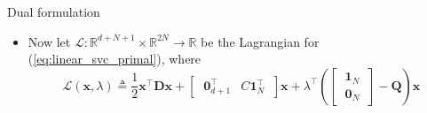 \documentclass{beamer}
\numberwithin{equation}{section}
\newcommand{\aref}[1]{\alert{\ref{#1}}}
\begin{document}
\begin{frame}{Dual formulation}
\begin{itemize}
        \item
        Now let $ \mathcal{L} : \mathbb{R}^{d + N + 1} \times \mathbb{R}^{2N}
        \rightarrow \mathbb{R} $ be the Lagrangian for
        (\aref{eq:linear_svc_primal}), where
        \begin{equation} \label{eq:linear_svc_lagrangian}
            \mathcal{L}(\mathbf{x}, \lambda) \triangleq
            \frac{1}{2}\mathbf{x}^\top\mathbf{D}\mathbf{x} +
            \begin{bmatrix} \ \mathbf{0}_{d + 1}^\top & C\mathbf{1}_N^\top \ \end{bmatrix}\mathbf{x} + \lambda^\top\left(\begin{bmatrix} \ \mathbf{1}_N \ \\ \ \mathbf{0}_N \ \end{bmatrix} - \mathbf{Q}\right)\mathbf{x}
        \end{equation}
    \end{itemize}
\end{frame}
\end{document}
